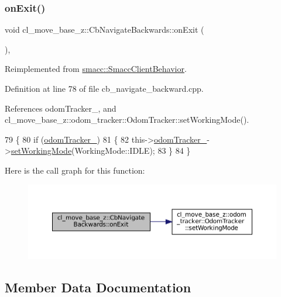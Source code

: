 \subsubsection{\texorpdfstring{on\+Exit()}{onExit()}}
{\footnotesize\ttfamily void cl\+\_\+move\+\_\+base\+\_\+z\+::\+Cb\+Navigate\+Backwards\+::on\+Exit (\begin{DoxyParamCaption}{ }\end{DoxyParamCaption})\hspace{0.3cm}{\ttfamily [override]}, {\ttfamily [virtual]}}



Reimplemented from \hyperlink{classsmacc_1_1SmaccClientBehavior_ac0cd72d42bd00425362a97c9803ecce5}{smacc\+::\+Smacc\+Client\+Behavior}.



Definition at line 78 of file cb\+\_\+navigate\+\_\+backward.\+cpp.



References odom\+Tracker\+\_\+, and cl\+\_\+move\+\_\+base\+\_\+z\+::odom\+\_\+tracker\+::\+Odom\+Tracker\+::set\+Working\+Mode().


\begin{DoxyCode}
79     \{
80         \textcolor{keywordflow}{if} (\hyperlink{classcl__move__base__z_1_1CbNavigateBackwards_a75a8ae7aef6c72e96f4037c4941b0341}{odomTracker\_})
81         \{
82             this->\hyperlink{classcl__move__base__z_1_1CbNavigateBackwards_a75a8ae7aef6c72e96f4037c4941b0341}{odomTracker\_}->\hyperlink{classcl__move__base__z_1_1odom__tracker_1_1OdomTracker_aeed01bdefd9a1cc709b0b3e4eed285ed}{setWorkingMode}(WorkingMode::IDLE);
83         \}
84     \}
\end{DoxyCode}
Here is the call graph for this function\+:
\nopagebreak
\begin{figure}[H]
\begin{center}
\leavevmode
\includegraphics[width=350pt]{classcl__move__base__z_1_1CbNavigateBackwards_a92858e20e6401051203f5dfa4aef60dc_cgraph}
\end{center}
\end{figure}


\subsection{Member Data Documentation}
\mbox{\label{classcl__move__base__z_1_1CbNavigateBackwards_abb7099e4e18602f6cf06c4f5534a2a15}} 
